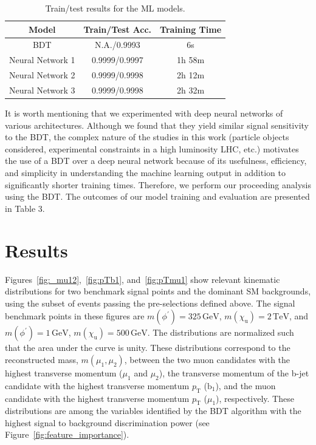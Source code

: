 \begin{table}
    \centering
    \begin{tabular}{c  c  c}
    \hline
    { Model} & { Train/Test Acc. } & { Training Time} \\
    \hline
    \small
    BDT & N.A./0.9993  & 6s\\
    Neural Network 1 & 0.9999/0.9997 & 1h 58m \\
    Neural Network 2 & 0.9999/0.9998 & 2h 12m \\
    Neural Network 3 & 0.9999/0.9998 & 2h 32m\\
    \hline
    \end{tabular}
    \caption{Train/test results for the ML models.}
    \centering
\end{table}

It is worth mentioning that we experimented with deep neural networks of various architectures. Although we found that they yield similar signal sensitivity to the BDT, the complex nature of the studies in this
work (particle objects considered, experimental constraints in a high luminosity LHC, etc.) motivates the use of a BDT over a deep neural network because of its usefulness, efficiency, and simplicity in understanding the machine learning output in addition to significantly shorter training times. Therefore, we perform our proceeding analysis using the BDT. The outcomes of our model training and evaluation are presented in Table 3. 

\section{Results}\label{sec:results}
Figures~\ref{fig:_mu12},~\ref{fig:pTb1}, and~\ref{fig:pTmu1} show relevant kinematic distributions for two benchmark signal points and the dominant SM backgrounds, using the subset of events passing the pre-selections defined above. The signal benchmark points in these figures are $m(\phi^{'}) = 325 \, \mathrm{GeV}$, $m(\chi_{\mathrm{u}}) = 2\, \mathrm{TeV}$, and $m(\phi^{'}) = 1 \, \mathrm{GeV}$, $m(\chi_{\mathrm{u}}) = 500\, \mathrm{GeV}$. The distributions are normalized such that the area under the curve is unity. These distributions correspond to the reconstructed mass, $m(\mu_{1}, \mu_{2})$, between the two muon candidates with the highest transverse momentum ($\mu_{1}$ and $\mu_{2}$), 
the transverse momentum of the b-jet candidate with the highest transverse momentum $p_{\mathrm{T}}$ ($\mathrm{b_{1}}$), and the muon candidate with the highest transverse momentum $p_{\mathrm{T}}$ ($\mu_{1}$), respectively. 
These distributions are among the variables identified by the BDT algorithm with the highest signal to background discrimination power (see Figure~\ref{fig:feature_importance}).

